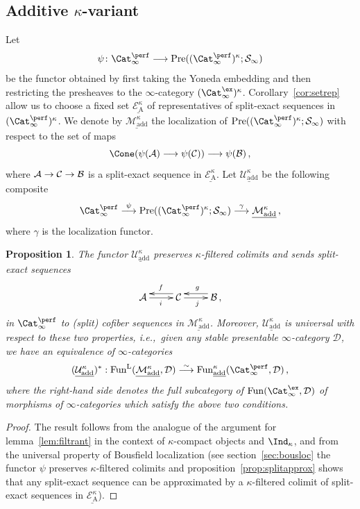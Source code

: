 \documentclass{amsart}
\renewcommand{\to}{\mathchoice{\longrightarrow}{\rightarrow}{\rightarrow}{\rightarrow}}
\newcommand{\cA}{{\mathcal A}}
\newcommand{\cB}{{\mathcal B}}
\newcommand{\cC}{{\mathcal C}}
\newcommand{\cD}{{\mathcal D}}
\newcommand{\cE}{{\mathcal E}}
\newcommand{\cM}{{\mathcal M}}
\newcommand{\cU}{{\mathcal U}}
\let\catsymbfont\mathcal
\newcommand{\aS}{{\catsymbfont{S}}}
\renewcommand{\L}{\mathrm{L}}
\newcommand{\Pre}{\mathrm{Pre}}
\newcommand{\stabcat}{\Cat_\i^{\ex}}
\newcommand{\idemstabcat}{\Cat_\i^{\perf}}
\newcommand{\Fun}{\mathrm{Fun}} %
\newcommand{\ispec}{\aS_{\infty}}
\newcommand{\ie}{{i.e.,}\ }
\newcommand{\too}{\longrightarrow}%
\renewcommand{\i}{\infty}
\newcommand{\uMotadd}{\underline{\cM_{\mathrm{add}}^\kappa}}
\newcommand{\uUmot}{\underline{\cU_{\mathrm{add}}^\kappa}}
\numberwithin{equation}{section}
\newtheorem{proposition}[equation]{Proposition}
\theoremstyle{definition}
\begin{document}
\subsection{Additive $\kappa$-variant}\label{sec:k-add}

Let
\[
\psi\colon \idemstabcat \too \Pre((\idemstabcat)^{\kappa}; \ispec)
\]
be the functor obtained by first taking the Yoneda embedding and then
restricting the presheaves to the $\i$-category
$(\stabcat)^\kappa$.  Corollary~\ref{cor:setrep} allow us to choose a
fixed set $\underline{\cE_\mathrm{A}^\kappa}$ of representatives of split-exact
sequences in $(\idemstabcat)^\kappa$.  We denote by $\uMotadd$ the
localization of
$\Pre((\idemstabcat)^{\kappa}; \ispec)$ with respect to the set of maps
\[
\Cone(\psi(\cA) \to \psi(\cC)) \too \psi(\cB)\,,
\]
where $\cA \to \cC \to \cB$ is a split-exact sequence in
$\underline{\cE_\mathrm{A}^\kappa}$. Let $\uUmot$ be the following composite
\[
\idemstabcat \stackrel{\psi}{\too} \Pre((\idemstabcat)^{\kappa}; \ispec) \stackrel{\gamma}{\too} \uMotadd\,,
\]
where $\gamma$ is the localization functor.

\begin{proposition}\label{prop:k-additive}
The functor $\uUmot$ preserves $\kappa$-filtered colimits and sends split-exact sequences
\[
\xymatrix{
\cA \ar[r]_{i} & \cC \ar@<-1ex>[l]_f
\ar[r]_j & \cB \ar@<-1ex>[l]_{g} \,,
}
\]
in $\idemstabcat$ to (split) cofiber sequences
in $\uMotadd$.
Moreover, $\uUmot$ is universal with respect to these two properties, \ie given any stable presentable $\i$-category $\cD$, we have an equivalence of $\i$-categories
$$
(\uUmot)^{\ast}: \Fun^{\L}(\uMotadd, \cD) \stackrel{\sim}{\too} \Fun_{\underline{\mathrm{add}}}^\kappa(\idemstabcat, \cD)\,,$$
where the right-hand side denotes the full subcategory of
$\Fun(\stabcat, \cD)$ of morphisms of $\i$-categories which satisfy
the above two conditions.
\end{proposition}

\begin{proof}
The result follows from the analogue of the argument for
lemma~\ref{lem:filtrant} in the context of $\kappa$-compact objects
and $\Ind_{\kappa}$, and from the universal property of Bousfield
localization (see section~\ref{sec:bousloc} the functor $\psi$
preserves $\kappa$-filtered colimits and
proposition~\ref{prop:splitapprox} shows that any split-exact sequence
can be approximated by a $\kappa$-filtered colimit of split-exact
sequences in $\underline{\cE_\mathrm{A}^\kappa}$).
\end{proof}
\end{document}
